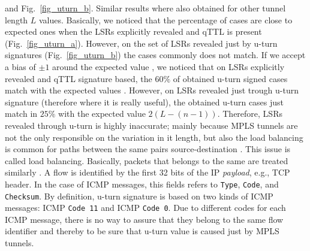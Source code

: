 and Fig.~\ref{fig_uturn_b}. Similar results
where also obtained for other tunnel length $L$ values. Basically, we noticed
that the percentage of cases  are close to expected ones when
the LSRs explicitly revealed  and qTTL is present
(Fig.~\ref{fig_uturn_a}). However, on the set of LSRs revealed just by u-turn
signatures (Fig.~\ref{fig_uturn_b}) the cases 
commonly does not match. If we accept a bias of $ \pm 1$ around the expected
value , we noticed that on LSRs explicitly revealed and qTTL
signature based, the $60\%$ of obtained u-turn signed cases match with the
expected values . However, on LSRs revealed just trough
u-turn signature (therefore where it is really useful), the obtained u-turn
cases just match in $25\%$ with the expected value $2(L-(n-1))$.
Therefore, LSRs revealed  through u-turn is highly inaccurate; mainly
because MPLS tunnels are not the only responsible on the variation in it length,
but also the load balancing is common for paths between the same pairs
source-destination \cite{BRICE07}. This issue is called  load
balancing. Basically, packets that belongs to the same  are treated
similarly \cite{BRICE06}. A flow is identified by the first 32 bits of the IP
\textit{payload}, e.g., TCP header. In the case of ICMP messages, this fields
refers to \texttt{Type}, \texttt{Code}, and \texttt{Checksum}.
By definition, u-turn signature is based on two kinds of ICMP messages:
ICMP \echoreply \texttt{Code 11} and ICMP \ttlexceeded \texttt{Code 0}.
Due to different codes for each ICMP message, there is no way to assure that
they belong to the same flow identifier and thereby to be sure that u-turn value
is caused just by MPLS tunnels.  
